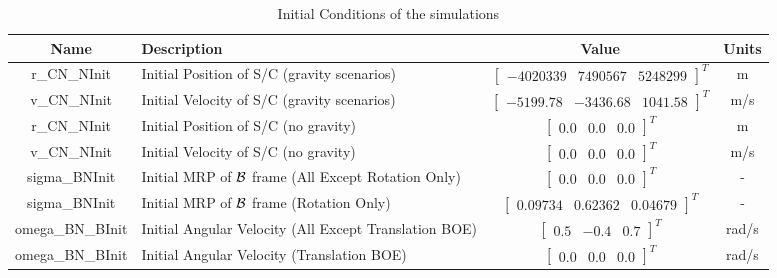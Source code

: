 \begin{table}[htbp]
	\caption{Initial Conditions of the simulations}
	\label{tab:initial}
	\centering \fontsize{10}{10}\selectfont
	\begin{tabular}{ c | p{2.25in} | c | c } %
		\hline
		\textbf{Name}  & \textbf{Description}  & \textbf{Value} & \textbf{Units} \\
		\hline
		r\_CN\_NInit & Initial Position of S/C (gravity scenarios) & $\begin{bmatrix}
		-4020339 &	7490567 & 5248299 
		\end{bmatrix}^T$ & m \\
		v\_CN\_NInit & Initial Velocity of S/C (gravity scenarios) & $\begin{bmatrix}
		-5199.78 & -3436.68 & 1041.58
		\end{bmatrix}^T$ & m/s \\
		r\_CN\_NInit & Initial Position of S/C (no gravity) & $\begin{bmatrix}
		0.0 & 0.0 & 0.0 
		\end{bmatrix}^T$ & m \\
		v\_CN\_NInit & Initial Velocity of S/C (no gravity) & $\begin{bmatrix}
		0.0 & 0.0 & 0.0
		\end{bmatrix}^T$ & m/s \\
		sigma\_BNInit & Initial MRP of $\cal{B}$ frame (All Except Rotation Only) & $\begin{bmatrix}
		0.0 & 0.0 & 0.0
		\end{bmatrix}^T$ & - \\
		sigma\_BNInit & Initial MRP of $\cal{B}$ frame (Rotation Only) & $\begin{bmatrix}
		0.09734 & 0.62362 & 0.04679
		\end{bmatrix}^T$ & - \\
		omega\_BN\_BInit & Initial Angular Velocity (All Except Translation BOE) & $\begin{bmatrix}
		0.5 & -0.4 & 0.7
		\end{bmatrix}^T$ & rad/s \\
		omega\_BN\_BInit & Initial Angular Velocity (Translation BOE) & $\begin{bmatrix}
		0.0 & 0.0 & 0.0
		\end{bmatrix}^T$ & rad/s \\
		\hline
	\end{tabular}
\end{table}

